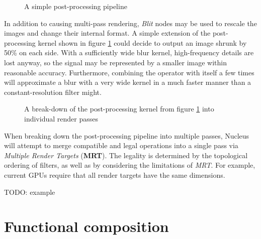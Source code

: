 \begin{figure}[h!]
  \centering
    \caption[Simple post-processing]{A simple post-processing pipeline}
  \label{fig:SimplePostProc}
\end{figure}

In addition to causing multi-pass rendering, \emph{Blit} nodes may be used to rescale the images and change their internal format. A simple extension of the post-processing kernel shown in figure \ref{fig:SimplePostProc} could decide to output an image shrunk by 50\% on each side. With a sufficiently wide blur kernel, high-frequency details are lost anyway, so the signal may be represented by a smaller image within reasonable accuracy. Furthermore, combining the operator with itself a few times will approximate a blur with a very wide kernel in a much faster manner than a constant-resolution filter might.

\begin{figure}[h!]
  \centering
    \caption[Simple post-processing breakdown]{A break-down of the post-processing kernel from figure \ref{fig:SimplePostProc} into individual render passes}
  \label{fig:SimplePostProcBreakdown}
\end{figure}

When breaking down the post-processing pipeline into multiple passes, Nucleus will attempt to merge compatible and legal operations into a single pass via \emph{Multiple Render Targets} (\textbf{MRT}). The legality is determined by the topological ordering of filters, as well as by considering the limitations of \emph{MRT}. For example, current GPUs require that all render targets have the same dimensions.

TODO: example


\section{Functional composition}
\label{sec:FunctionalComposition}

